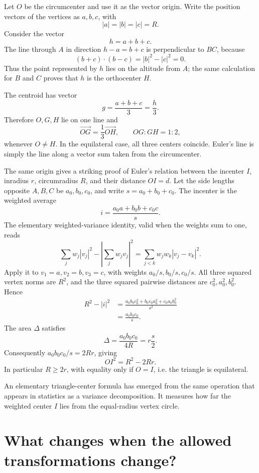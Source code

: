 Let \(O\) be the circumcenter and use it as the vector origin. Write the position vectors of the vertices as \(a,b,c\), with
\[
 |a|=|b|=|c|=R.
\]
Consider the vector
\[
 h=a+b+c.
\]
The line through \(A\) in direction \(h-a=b+c\) is perpendicular to \(BC\), because
\[
 (b+c)\cdot(b-c)=|b|^2-|c|^2=0.
\]
Thus the point represented by \(h\) lies on the altitude from \(A\); the same calculation for \(B\) and \(C\) proves that \(h\) is the orthocenter \(H\).

The centroid has vector
\[
 g=\frac{a+b+c}{3}=\frac h3.
\]
Therefore \(O,G,H\) lie on one line and
\[
 \boxed{\overrightarrow{OG}=\frac13\overrightarrow{OH},
 \qquad OG:GH=1:2,}
\]
whenever \(O\ne H\). In the equilateral case, all three centers coincide. Euler's line is simply the line along a vector sum taken from the circumcenter.

The same origin gives a striking proof of Euler's relation between the incenter \(I\), inradius \(r\), circumradius \(R\), and their distance \(OI=d\). Let the side lengths opposite \(A,B,C\) be \(a_0,b_0,c_0\), and write \(s=a_0+b_0+c_0\). The incenter is the weighted average
\[
 i=\frac{a_0a+b_0b+c_0c}{s}.
\]
The elementary weighted-variance identity, valid when the weights sum to one, reads
\[
 \sum_jw_j|v_j|^2-
 \left|\sum_jw_jv_j\right|^2
 =\sum_{j<k}w_jw_k|v_j-v_k|^2.
\]
Apply it to \(v_1=a,v_2=b,v_3=c\), with weights \(a_0/s,b_0/s,c_0/s\). All three squared vertex norms are \(R^2\), and the three squared pairwise distances are \(c_0^2,a_0^2,b_0^2\). Hence
\[
 \begin{aligned}
 R^2-|i|^2
 &=\frac{a_0b_0c_0^2+
          b_0c_0a_0^2+
          c_0a_0b_0^2}{s^2}\\
 &=\frac{a_0b_0c_0}{s}.
 \end{aligned}
\]
The area \(\Delta\) satisfies
\[
 \Delta=\frac{a_0b_0c_0}{4R}
        =r\frac{s}{2}.
\]
Consequently \(a_0b_0c_0/s=2Rr\), giving
\[
 \boxed{OI^2=R^2-2Rr.}
\]
In particular \(R\ge2r\), with equality only if \(O=I\), i.e. the triangle is equilateral.

An elementary triangle-center formula has emerged from the same operation that appears in statistics as a variance decomposition. It measures how far the weighted center \(I\) lies from the equal-radius vertex circle.

\section{What changes when the allowed transformations change?}


